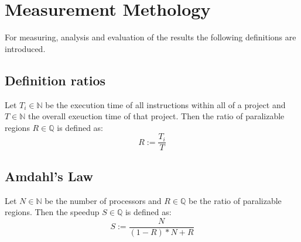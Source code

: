 \section{Measurement Methology}
For measuring, analysis and evaluation of the results the following definitions are introduced.
\subsection{Definition ratios}
Let \(T_i\in\mathbb{N}\) be the execution time of all instructions within all \scops of a project and \(T\in\mathbb{N}\) the overall exeuction time of that project.
Then the ratio of paralizable regions \(R\in\mathbb{Q}\) is defined as:
\[R := \frac{T_i}{T}\]

\subsection[Amdahl's Law]{Amdahl's Law \cite{AmdahlsLaw}}
Let \(N\in\mathbb{N}\) be the number of processors and \(R\in\mathbb{Q}\) be the ratio of paralizable regions.
Then the speedup \(S\in\mathbb{Q}\) is defined as:
\[S := \frac{N}{(1-R)*N+R}\]
